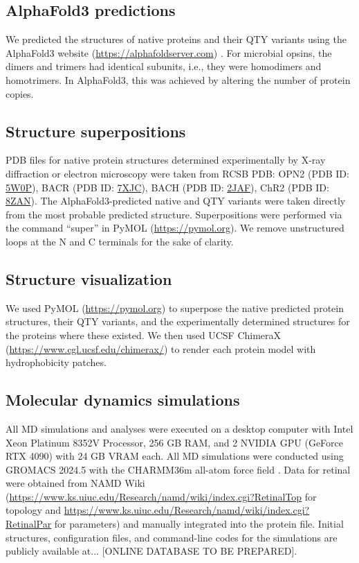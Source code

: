 \documentclass[fleqn, 10pt, lineno]{manuscript}
\begin{document}
\subsection*{AlphaFold3 predictions}

We predicted the structures of native proteins and their QTY variants using the AlphaFold3 website (\url{https://alphafoldserver.com}) \citep{Abramson_2024}. For microbial opsins, the dimers and trimers had identical subunits, i.e., they were homodimers and homotrimers. In AlphaFold3, this was achieved by altering the number of protein copies. 

\subsection*{Structure superpositions}

PDB files for native protein structures determined experimentally by X-ray diffraction or electron microscopy were taken from RCSB PDB: OPN2 (PDB ID: \href{https://www.rcsb.org/structure/5W0P}{5W0P}), BACR (PDB ID: \href{https://www.rcsb.org/structure/7XJC}{7XJC}), BACH (PDB ID: \href{https://www.rcsb.org/structure/2JAF}{2JAF}), ChR2 (PDB ID: \href{https://www.rcsb.org/structure/8ZAN}{8ZAN}). The AlphaFold3-predicted native and QTY variants were taken directly from the most probable predicted structure. Superpositions were performed via the command ``super'' in PyMOL (\url{https://pymol.org}). We remove unstructured loops at the N and C terminals for the sake of clarity. 

\subsection*{Structure visualization}

We used PyMOL (\url{https://pymol.org}) to superpose the native predicted protein structures, their QTY variants, and the experimentally determined structures for the proteins where these existed. We then used UCSF ChimeraX (\url{https://www.cgl.ucsf.edu/chimerax/}) to render each protein model with hydrophobicity patches.  

\subsection*{Molecular dynamics simulations}

All MD simulations and analyses were executed on a desktop computer with Intel Xeon Platinum 8352V Processor, 256 GB RAM, and 2 NVIDIA GPU (GeForce RTX 4090) with 24 GB VRAM each. All MD simulations were conducted using GROMACS 2024.5 \citep{Abraham_2015} with the CHARMM36m all-atom force field \citep{Huang_2017}. Data for retinal were obtained from NAMD Wiki (\url{https://www.ks.uiuc.edu/Research/namd/wiki/index.cgi?RetinalTop} for topology and \url{https://www.ks.uiuc.edu/Research/namd/wiki/index.cgi?RetinalPar} for parameters) and manually integrated into the protein file. Initial structures, configuration files, and command-line codes for the simulations are publicly available at... [ONLINE DATABASE TO BE PREPARED]. 
\end{document}
